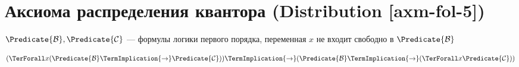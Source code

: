 
\section{Аксиома распределения квантора (Distribution [axm-fol-5])}

\hypertarget{axm-fol-5}{}
\begin{axiom}
\label{entity:axm-fol-5}
$\Predicate{\mathcal{B}}, \Predicate{\mathcal{C}}$ --- формулы логики первого порядка,
переменная $x$ не входит свободно в $\Predicate{\mathcal{B}}$

\[
(\TerForall x (\Predicate{\mathcal{B}} \TermImplication{\to} \Predicate{\mathcal{C}})) \TermImplication{\to} (\Predicate{\mathcal{B}} \TermImplication{\to} (\TerForall x \Predicate{\mathcal{C}}))
\]
\end{axiom}